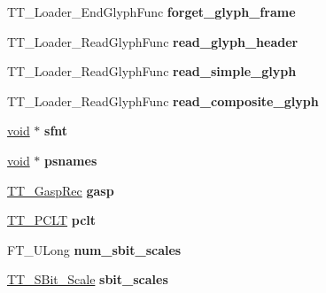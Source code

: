 \begin{DoxyCompactItemize}
\item 
\mbox{\label{struct_t_t___face_rec___ac86fbd960fe6c919eb82cd7233655894}} 
T\+T\+\_\+\+Loader\+\_\+\+End\+Glyph\+Func {\bfseries forget\+\_\+glyph\+\_\+frame}
\item 
\mbox{\label{struct_t_t___face_rec___a343db3c51a3047324fea455ac06d7cb3}} 
T\+T\+\_\+\+Loader\+\_\+\+Read\+Glyph\+Func {\bfseries read\+\_\+glyph\+\_\+header}
\item 
\mbox{\label{struct_t_t___face_rec___aa9f550ad4e10d8232cdd3427e02e7603}} 
T\+T\+\_\+\+Loader\+\_\+\+Read\+Glyph\+Func {\bfseries read\+\_\+simple\+\_\+glyph}
\item 
\mbox{\label{struct_t_t___face_rec___ac261cd70ce36c35c615fc5e2319b40c4}} 
T\+T\+\_\+\+Loader\+\_\+\+Read\+Glyph\+Func {\bfseries read\+\_\+composite\+\_\+glyph}
\item 
\mbox{\label{struct_t_t___face_rec___a4c198db893da1900ee0384969d10f9f6}} 
\hyperlink{interfacevoid}{void} $\ast$ {\bfseries sfnt}
\item 
\mbox{\label{struct_t_t___face_rec___a68cd8f2554793512af611422092b4814}} 
\hyperlink{interfacevoid}{void} $\ast$ {\bfseries psnames}
\item 
\mbox{\label{struct_t_t___face_rec___a042468253b53931f4901ac47e37fbe14}} 
\hyperlink{struct_t_t___gasp__}{T\+T\+\_\+\+Gasp\+Rec} {\bfseries gasp}
\item 
\mbox{\label{struct_t_t___face_rec___a18faed293bc94ac00fa7612b175adc0e}} 
\hyperlink{struct_t_t___p_c_l_t__}{T\+T\+\_\+\+P\+C\+LT} {\bfseries pclt}
\item 
\mbox{\label{struct_t_t___face_rec___a5437fbf3ee625e001c28ec975326922a}} 
F\+T\+\_\+\+U\+Long {\bfseries num\+\_\+sbit\+\_\+scales}
\item 
\mbox{\label{struct_t_t___face_rec___a13215cb0365ee61c889385919fbd381f}} 
\hyperlink{struct_t_t___s_bit___scale_rec__}{T\+T\+\_\+\+S\+Bit\+\_\+\+Scale} {\bfseries sbit\+\_\+scales}

\end{DoxyCompactItemize}
